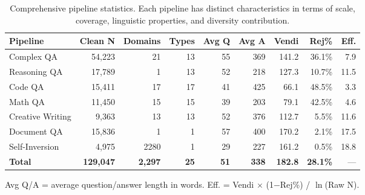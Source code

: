 \begin{table}[t]
\centering
\caption{Comprehensive pipeline statistics. Each pipeline has distinct characteristics in terms of scale, coverage, linguistic properties, and diversity contribution.}
\label{tab:pipeline_stats}
\scriptsize
\begin{tabular}{lrrrrrrrr}
\toprule
\textbf{Pipeline} & \textbf{Clean N} & \textbf{Domains} & \textbf{Types} & \textbf{Avg Q} & \textbf{Avg A} & \textbf{Vendi} & \textbf{Rej\%} & \textbf{Eff.} \\
\midrule
Complex QA & 54,223 & 21 & 13 & 55 & 369 & 141.2 & 36.1\% & 7.9 \\
\midrule
Reasoning QA & 17,789 & 1 & 13 & 52 & 218 & 127.3 & 10.7\% & 11.5 \\
\midrule
Code QA & 15,411 & 17 & 17 & 41 & 425 & 66.1 & 48.5\% & 3.3 \\
\midrule
Math QA & 11,450 & 15 & 15 & 39 & 203 & 79.1 & 42.5\% & 4.6 \\
\midrule
Creative Writing & 9,363 & 13 & 13 & 52 & 376 & 112.7 & 5.5\% & 11.6 \\
\midrule
Document QA & 15,836 & 1 & 1 & 57 & 400 & 170.2 & 2.1\% & 17.5 \\
\midrule
Self-Inversion & 4,975 & 2280 & 1 & 29 & 227 & 161.2 & 0.5\% & 18.8 \\
\midrule
\textbf{Total} & \textbf{129,047} & \textbf{2,297} & \textbf{25} & \textbf{51} & \textbf{338} & \textbf{182.8} & \textbf{28.1\%} & --- \\
\bottomrule
\end{tabular}
\vspace{-0.5em}
\begin{flushleft}
\scriptsize Avg Q/A = average question/answer length in words. Eff. = Vendi $\times$ (1$-$Rej\%) / $\ln$(Raw N).
\end{flushleft}
\end{table}